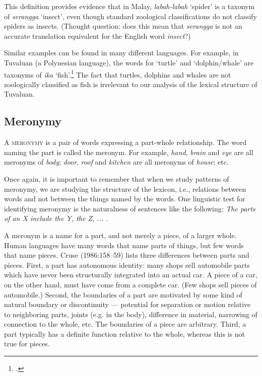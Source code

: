 This definition provides evidence that in Malay, \textit{labah-labah} ‘spider’ is a taxonym of \textit{serangga} ‘insect’, even though standard zoological classifications do not classify spiders as insects. (Thought question: does this mean that \textit{serangga} is not an accurate translation equivalent for the English word \textit{insect}?)



Similar examples can be found in many different languages. For example, in Tuvaluan (a Polynesian language), the words for ‘turtle’ and ‘dolphin/whale’ are taxonyms of \textit{ika} ‘fish’.\footnote{\citet[192]{Finegan1999}.} The fact that turtles, dolphins and whales are not zoologically classified as fish is irrelevant to our analysis of the lexical structure of Tuvaluan.


\subsection{Meronymy}\label{sec:} %

A \textsc{meronymy} is a pair of words expressing a part-whole relationship. The word naming the part is called the meronym. For example, \textit{hand}, \textit{brain} and \textit{eye} are all meronyms of \textit{body}; \textit{door}, \textit{roof} and \textit{kitchen} are all meronyms of \textit{house}; etc.



Once again, it is important to remember that when we study patterns of meronymy, we are studying the structure of the lexicon, i.e., relations between words and not between the things named by the words. One linguistic test for identifying meronymy is the naturalness of sentences like the following: \textit{The parts of an X include the Y, the Z, ...} \citep[161]{Cruse1986}.



A meronym is a name for a part, and not merely a piece, of a larger whole. Human languages have many words that name parts of things, but few words that name pieces. Cruse (1986:158–59) lists three differences between parts and pieces. First, a part has autonomous identity: many shops sell automobile parts which have never been structurally integrated into an actual car. A piece of a car, on the other hand, must have come from a complete car. (Few shops sell pieces of automobile.) Second, the boundaries of a part are motivated by some kind of natural boundary or discontinuity — potential for separation or motion relative to neighboring parts, joints (e.g. in the body), difference in material, narrowing of connection to the whole, etc. The boundaries of a piece are arbitrary. Third, a part typically has a definite function relative to the whole, whereas this is not true for pieces.


